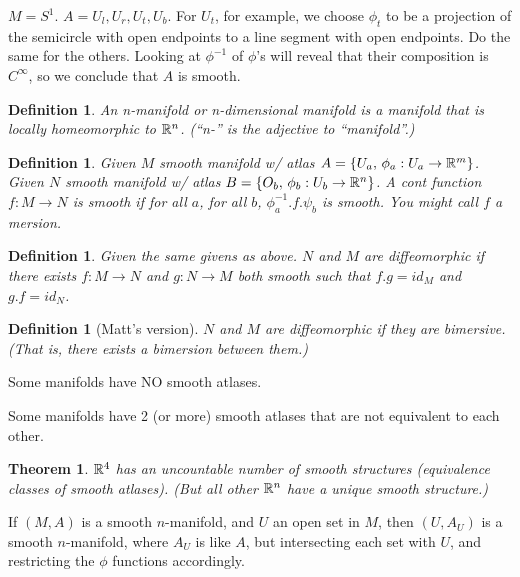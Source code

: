 \documentclass[11pt]{amsbook}
\theoremstyle{mystyle} \newtheorem{thrm}[thm]{Theorem}
\theoremstyle{mystyle} \newtheorem{defi}[thm]{Definition}
\theoremstyle{mystyle} \newtheorem{coro}[thm]{Corollary}
\theoremstyle{mystyle} \newtheorem{propo}[thm]{Proposition}
\theoremstyle{mystyle} \newtheorem{lemm}[thm]{Lemma}
\numberwithin{thm}{section}
\newcommand{\de}{\emph}
\begin{document}
\begin{example}
	$M = S^1$.  $A = {U_l, U_r, U_t, U_b}$.  For $U_t$, for example, we choose $\phi_t$ to be a projection of the semicircle with open endpoints to a line segment with open endpoints.  Do the same for the others.  Looking at $\phi^{-1}$ of $\phi$'s will reveal that their composition is $C^\infty$, so we conclude that $A$ is smooth.
\end{example}

\begin{defi}
	An \de{n-}manifold or \de{n-dimensional} manifold is a manifold that is locally homeomorphic to ${\mathbb R}^n$.  (``n-'' is the adjective to ``manifold''.)
\end{defi}


\begin{defi}
	Given $M$ smooth manifold w/ atlas $A = \{ U_a, \,  \phi_a : U_a \to {\mathbb R}^m \}$.
	Given $N$ smooth manifold w/ atlas $B = \{ O_b, \,  \phi_b : U_b \to {\mathbb R}^n \}$.
	A cont function $f : M \to N$ is \de{smooth} if for all $a$, for all $b$, $\phi_a^{-1}.f.\psi_b$ is smooth.  You might call $f$ a \de{mersion}.
\end{defi}
\begin{defi}
	Given the same givens as above.
	$N$ and $M$ are \de{diffeomorphic} if there exists $f : M \to N$ and $g : N \to M$ both smooth such that $f.g = id_M$ and $g.f = id_N$.
\end{defi}
\begin{defi}[Matt's version]
	$N$ and $M$ are \de{diffeomorphic} if they are bimersive.  (That is, there exists a bimersion between them.)
\end{defi}

\begin{rmk}
	Some manifolds have NO smooth atlases.

	Some manifolds have 2 (or more) smooth atlases that are not equivalent to each other.
\end{rmk}


\begin{thrm}
	${\mathbb R}^4$ has an uncountable number of smooth structures (equivalence classes of smooth atlases).  (But all other ${\mathbb R}^n$ have a unique smooth structure.)
\end{thrm}

\begin{rmk}
	If $(M,A)$ is a smooth $n$-manifold, and $U$ an open set in $M$, then $(U,A_U)$ is a smooth $n$-manifold, where $A_U$ is like $A$, but intersecting each set with $U$, and restricting the $\phi$ functions accordingly.
\end{rmk}
\end{document}
